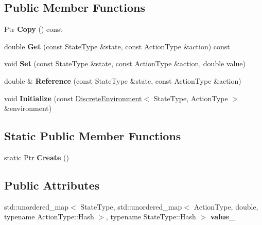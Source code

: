 \subsection*{Public Member Functions}
\begin{DoxyCompactItemize}
\item 
\hypertarget{structrl_1_1_discrete_action_value_a017adbda6b0ca391888bd77630e53d69}{}\label{structrl_1_1_discrete_action_value_a017adbda6b0ca391888bd77630e53d69} 
Ptr {\bfseries Copy} () const
\item 
\hypertarget{structrl_1_1_discrete_action_value_a86394535a77c0746f835e978e830ec3b}{}\label{structrl_1_1_discrete_action_value_a86394535a77c0746f835e978e830ec3b} 
double {\bfseries Get} (const State\+Type \&state, const Action\+Type \&action) const
\item 
\hypertarget{structrl_1_1_discrete_action_value_ab46b4cbc1ecd2b6554235c76c77af28c}{}\label{structrl_1_1_discrete_action_value_ab46b4cbc1ecd2b6554235c76c77af28c} 
void {\bfseries Set} (const State\+Type \&state, const Action\+Type \&action, double value)
\item 
\hypertarget{structrl_1_1_discrete_action_value_a37baa9d4ee68d56e6524d7507195077f}{}\label{structrl_1_1_discrete_action_value_a37baa9d4ee68d56e6524d7507195077f} 
double \& {\bfseries Reference} (const State\+Type \&state, const Action\+Type \&action)
\item 
\hypertarget{structrl_1_1_discrete_action_value_a53bfe6dd502eefdb6fee9ac2ae7e7474}{}\label{structrl_1_1_discrete_action_value_a53bfe6dd502eefdb6fee9ac2ae7e7474} 
void {\bfseries Initialize} (const \hyperlink{classrl_1_1_discrete_environment}{Discrete\+Environment}$<$ State\+Type, Action\+Type $>$ \&environment)
\end{DoxyCompactItemize}
\subsection*{Static Public Member Functions}
\begin{DoxyCompactItemize}
\item 
\hypertarget{structrl_1_1_discrete_action_value_a44da86912d0d446a0194b6694ca186df}{}\label{structrl_1_1_discrete_action_value_a44da86912d0d446a0194b6694ca186df} 
static Ptr {\bfseries Create} ()
\end{DoxyCompactItemize}
\subsection*{Public Attributes}
\begin{DoxyCompactItemize}
\item 
\hypertarget{structrl_1_1_discrete_action_value_ad837fb542655db5d35c6593b890a09ac}{}\label{structrl_1_1_discrete_action_value_ad837fb542655db5d35c6593b890a09ac} 
std\+::unordered\+\_\+map$<$ State\+Type, std\+::unordered\+\_\+map$<$ Action\+Type, double, typename Action\+Type\+::\+Hash $>$, typename State\+Type\+::\+Hash $>$ {\bfseries value\+\_\+}
\end{DoxyCompactItemize}


